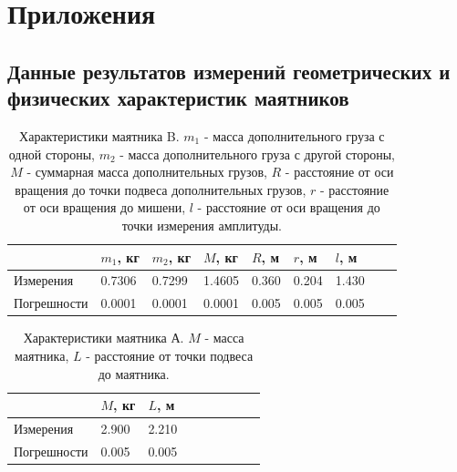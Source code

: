 \documentclass[12pt]{article}
\begin{document}
\section{Приложения}
\subsection{Данные результатов измерений геометрических и физических характеристик маятников} \label{app_1}
\begin{table}[H]
    \centering
    \begin{tabular}{|l|l|l|l|l|l|l|l|l|}
        \hline
                    & $m_1$, кг & $m_2$, кг & $M$, кг & $R$, м & $r$, м & $l$, м \\ 
        \hline
        Измерения   & 0.7306    & 0.7299    & 1.4605  & 0.360  & 0.204  & 1.430  \\
        Погрешности & 0.0001    & 0.0001    & 0.0001  & 0.005  & 0.005  & 0.005  \\
        \hline
    \end{tabular}
    
    \caption{Характеристики маятника B. $m_1$ - масса дополнительного груза с одной стороны,
        $m_2$ - масса дополнительного груза с другой стороны, $M$ - суммарная масса дополнительных грузов, $R$ - расстояние от оси вращения до
        точки подвеса дополнительных грузов, $r$ - расстояние от оси вращения до мишени, $l$ - расстояние от оси вращения до точки измерения амплитуды.}
    \label{tab:1}
\end{table}

\begin{table}[H]
    \centering
    \begin{tabular}{|l|l|l|l|l|l|l|l|l|}
        \hline
                    & $M$, кг & $L$, м \\ 
        \hline
        Измерения   & 2.900   & 2.210  \\
        Погрешности & 0.005   & 0.005  \\
        \hline
    \end{tabular}
    
    \caption{Характеристики маятника А. $M$ - масса маятника, $L$ - расстояние от точки подвеса до маятника.}
    \label{tab:2}
\end{table}
\end{document}
